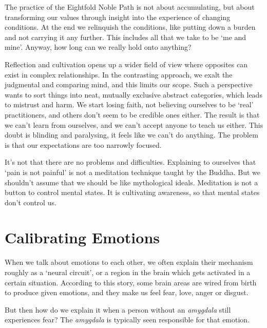 The practice of the Eightfold Noble Path is not about accumulating, but
about transforming our values through insight into the experience of
changing conditions. At the end we relinquish the conditions, like
putting down a burden and not carrying it any further. This includes all
that we take to be `me and mine'. Anyway, how long can we really hold
onto anything?


Reflection and cultivation opens up a wider field of view where
opposites can exist in complex relationships. In the contrasting
approach, we exalt the judgmental and comparing mind, and this limits
our scope. Such a perspective wants to sort things into neat, mutually
exclusive abstract categories, which leads to mistrust and harm. We
start losing faith, not believing ourselves to be `real' practitioners,
and others don't seem to be credible ones either. The result is that we
can't learn from ourselves, and we can't accept anyone to teach us
either. This doubt is blinding and paralysing, it feels like we can't do
anything. The problem is that our expectations are too narrowly focused.

It's not that there are no problems and difficulties. Explaining to
ourselves that `pain is not painful' is not a meditation technique
taught by the Buddha. But we shouldn't assume that we should be like
mythological ideals. Meditation is not a button to control mental
states. It is cultivating awareness, so that mental states don't control
us.

\section{Calibrating Emotions}

\enlargethispage*{\baselineskip}


\noindent When we talk about emotions to each other, we often explain
their mechanism roughly as a `neural circuit', or a region in the brain
which gets activated in a certain situation. According to this story,
some brain areas are wired from birth to produce given emotions, and
they make us feel fear, love, anger or disgust.

But then how do we explain it when a person without an \emph{amygdala}
still experiences fear? The \emph{amygdala} is typically seen
responsible for that emotion.

